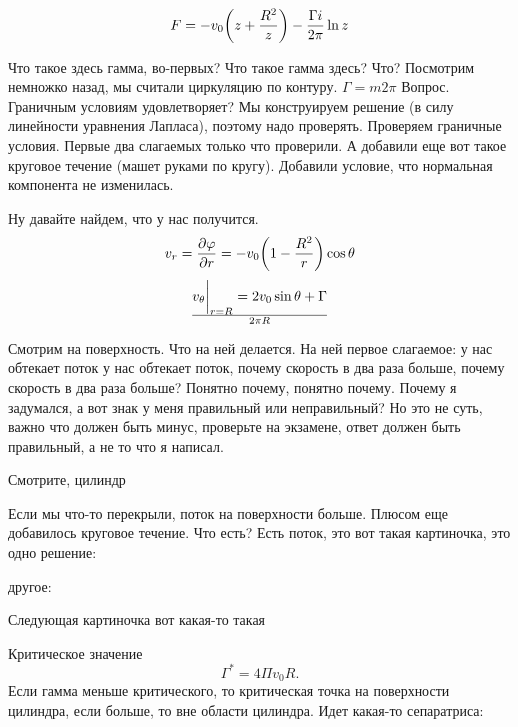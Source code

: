\begin{equation}
	F=-v_0\qty(z+\frac{R^2}{z})-\frac{\Gamma i}{2\pi}\ln{z}
\end{equation}

Что такое здесь гамма, во-первых? Что такое гамма здесь? Что? Посмотрим немножко назад, мы считали циркуляцию по контуру. $\Gamma=m 2\pi$ Вопрос. Граничным условиям удовлетворяет? Мы конструируем решение (в силу линейности уравнения Лапласа), поэтому надо проверять. Проверяем граничные условия. Первые два слагаемых только что проверили. А добавили еще вот такое круговое течение (машет руками по кругу). Добавили условие, что нормальная компонента не изменилась.

Ну давайте найдем, что у нас получится.
\begin{equation}
	v_r=\pdv{\varphi}{r}=-v_0\qty(1-\frac{R^2}{r})\cos\theta
\end{equation}
\begin{equation}
	v_\theta\bigg|_{r=R}=2v_0\sin\theta+\Gamma\over{2\pi R}
\end{equation}

Смотрим на поверхность. Что на ней делается. На ней первое слагаемое: у нас обтекает поток у нас обтекает поток, почему скорость в два раза больше, почему скорость в два раза больше? Понятно почему, понятно почему. Почему я задумался, а вот знак у меня правильный или неправильный? Но это не суть, важно что должен быть минус, проверьте на экзамене, ответ должен быть правильный, а не то что я написал.

Смотрите, цилиндр
\begin{comment}
  2v_0 <--\
           \
   ______   \
  /	     /\  \
 /	   R/  \  \
/	   /    \  \_____
*     *     |  <---------- v_0
\           /
 \         /
  \_______/
\end{comment}
Если мы что-то перекрыли, поток на поверхности больше. Плюсом еще добавилось круговое течение. Что есть? Есть поток, это вот такая картиночка, это одно решение:
\begin{comment}
       <--\
           \
   ______   \
  /	     /\  \
 /	   R/  \  \
/	   /    \  \_____
*     *     |  <---------- v_0
\           /
 \         /
  \_______/
  (обтекание)
\end{comment}
другое:
\begin{comment}
  /-----<--\
 /          \
/    ______  \
|   /	   \  \  
|  /	    \  \   
| /	         \  |
| *     *     | |
| \           / |
\  \         / /
 \  \_______/ /
  \__________/  
  (по кругу)
\end{comment}
Следующая картиночка вот какая-то такая
\begin{comment}
	картинка с критической траекторией
\end{comment}
Критическое значение
\begin{equation}
	\Gamma^*=4\Pi v_0 R.
\end{equation}
Если гамма меньше критического, то критическая точка на поверхности цилиндра, если больше, то вне области цилиндра. Идет какая-то сепаратриса:
\begin{comment}
	картинка с сепаратрисой. Студент Иванов построил картинки. Линии уровня.
\end{comment}

